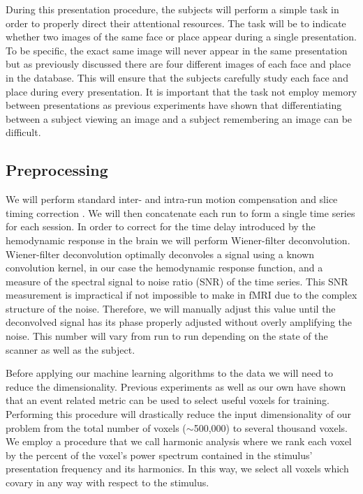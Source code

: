 \documentclass[12pt]{article}
\begin{document}
During this presentation procedure, the subjects will perform a simple task in order to properly direct their attentional resources.
The task will be to indicate whether two images of the same face or place appear during a single presentation.
To be specific, the exact same image will never appear in the same presentation but as previously discussed there are four different images of each face and place in the database.
This will ensure that the subjects carefully study each face and place during every presentation.
It is important that the task not employ memory between presentations as previous experiments \cite{Lewis-Peacock2012} have shown that differentiating between a subject viewing an image and a subject remembering an image can be difficult.

\subsection{Preprocessing}
We will perform standard inter- and intra-run motion compensation and slice timing correction \cite{Nestares2000}.
We will then concatenate each run to form a single time series for each session.
In order to correct for the time delay introduced by the hemodynamic response in the brain we will perform Wiener-filter deconvolution.
Wiener-filter deconvolution optimally deconvoles a signal using a known convolution kernel, in our case the hemodynamic response function, and a measure of the spectral signal to noise ratio (SNR) of the time series.
This SNR measurement is impractical if not impossible to make in fMRI due to the complex structure of the noise.
Therefore, we will manually adjust this value until the deconvolved signal has its phase properly adjusted without overly amplifying the noise.
This number will vary from run to run depending on the state of the scanner as well as the subject.

Before applying our machine learning algorithms to the data we will need to reduce the dimensionality.
Previous experiments \cite{Pereira2009} as well as our own have shown that an event related metric can be used to select useful voxels for training.
Performing this procedure will drastically reduce the input dimensionality of our problem from the total number of voxels ($\sim$500,000) to several thousand voxels.
We employ a procedure that we call harmonic analysis where we rank each voxel by the percent of the voxel's power spectrum contained in the stimulus' presentation frequency and its harmonics.
In this way, we select all voxels which covary in any way with respect to the stimulus.
\end{document}
